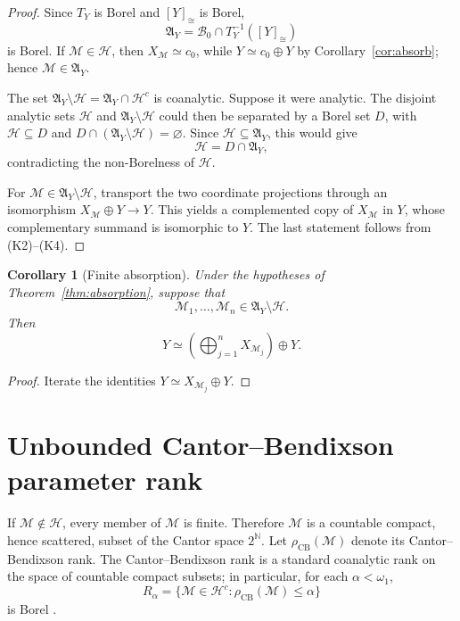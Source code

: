 \documentclass[11pt]{article}
\newtheorem{corollary}[theorem]{Corollary}
\theoremstyle{definition}
\newcommand{\czer}{c_0}
\newcommand{\iso}{\simeq}
\newcommand{\class}[1]{[#1]_{\cong}}
\newcommand{\A}{\mathfrak A}
\newcommand{\Hh}{\mathcal H}
\newcommand{\Bzero}{\mathcal B_0}
\newcommand{\rank}{\rho_{\mathrm{CB}}}
\begin{document}
\begin{proof}
Since \(T_Y\) is Borel and \(\class{Y}\) is Borel,
\[
    \A_Y=\Bzero\cap T_Y^{-1}(\class{Y})
\]
is Borel.  If \(\mathcal M\in\Hh\), then
\(X_{\mathcal M}\iso\czer\), while \(Y\iso\czer\oplus Y\) by
Corollary~\ref{cor:absorb}; hence \(\mathcal M\in\A_Y\).

The set \(\A_Y\setminus\Hh=\A_Y\cap\Hh^c\) is coanalytic.  Suppose it were
analytic.  The disjoint analytic sets \(\Hh\) and
\(\A_Y\setminus\Hh\) could then be separated by a Borel set \(D\), with
\(\Hh\subseteq D\) and
\(D\cap(\A_Y\setminus\Hh)=\varnothing\).  Since
\(\Hh\subseteq\A_Y\), this would give
\[
             \Hh=D\cap\A_Y,
\]
contradicting the non-Borelness of \(\Hh\).

For \(\mathcal M\in\A_Y\setminus\Hh\), transport the two coordinate
projections through an isomorphism
\(X_{\mathcal M}\oplus Y\to Y\).  This yields a complemented copy of
\(X_{\mathcal M}\) in \(Y\), whose complementary summand is isomorphic to
\(Y\).  The last statement follows from (K2)--(K4).
\end{proof}

\begin{corollary}[Finite absorption]\label{cor:finiteabs}
Under the hypotheses of Theorem~\ref{thm:absorption}, suppose that
\[
  \mathcal M_1,\ldots,\mathcal M_n\in\A_Y\setminus\Hh.
\]
Then
\[
 Y\iso \left(\bigoplus_{j=1}^n X_{\mathcal M_j}\right)\oplus Y.
\]
\end{corollary}

\begin{proof}
Iterate the identities \(Y\iso X_{\mathcal M_j}\oplus Y\).
\end{proof}

\section{Unbounded Cantor--Bendixson parameter rank}

If \(\mathcal M\notin\Hh\), every member of \(\mathcal M\) is finite.
Therefore \(\mathcal M\) is a countable compact, hence scattered, subset of
the Cantor space \(2^{\mathbb N}\).  Let \(\rank(\mathcal M)\) denote its
Cantor--Bendixson rank.  The Cantor--Bendixson rank is a standard coanalytic
rank on the space of countable compact subsets; in particular, for each
\(\alpha<\omega_1\),
\[
 R_\alpha=\{\mathcal M\in\Hh^c:\rank(\mathcal M)\le\alpha\}
\]
is Borel \cite[Section 34 and the boundedness theorem for coanalytic
ranks]{Kechris}.
\end{document}
